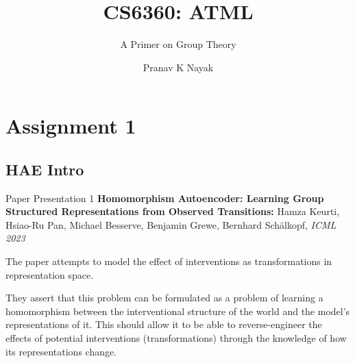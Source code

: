 \documentclass{beamer}
\title{CS6360: ATML}
\subtitle{A Primer on Group Theory}
\author{Pranav K Nayak}
\institute{IIT Hyderabad}
\date{}
\begin{document}
\begin{frame}
  \titlepage
\end{frame}
\begin{frame}
  \tableofcontents
\end{frame}
\section{Assignment 1}
\subsection{HAE Intro}
\begin{frame}{Paper Presentation 1}
  \textbf{Homomorphism Autoencoder: Learning Group Structured Representations from Observed Transitions:}  Hamza Keurti, Hsiao-Ru Pan, Michael Besserve, Benjamin Grewe, Bernhard Sch\"alkopf, \textit{ICML 2023}
  \vspace{5pt}


  The paper attempts to model the effect of interventions as transformations in representation space.

  They assert that this problem can be formulated as a problem of learning a homomorphism between the interventional structure of the world and the model's representations of it. This should allow it to be able to reverse-engineer the effects of potential interventions (transformations) through the knowledge of how its representations change.

\end{frame}
\end{document}
